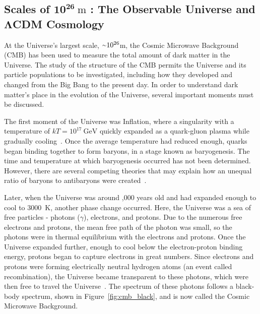 \subsection[Scales of $10^{26}\:\text{m}$ : The Observable Universe and $\Lambda$CDM Cosmology]{Scales of $\mathbf{10^{26}}\:\text{m}$ : The Observable Universe and $\mathbf{\Lambda}$CDM Cosmology}\label{dm_universe}
At the Universe's largest scale, $\nicetilde 10^{26}$m, the Cosmic Microwave Background (CMB) has been used to measure the total amount of dark matter in the Universe.
The study of the structure of the CMB permits the Universe and its particle populations to be investigated, including how they developed and changed from the Big Bang to the present day.
In order to understand dark matter's place in the evolution of the Universe, several important moments must be discussed.

The first moment of the Universe was Inflation, where a singularity with a temperature of $kT=10^{17}\:\textrm{GeV}$ quickly expanded as a quark-gluon plasma while gradually cooling~\cite{inflation0,inflation1,inflation2,inflation3}.
Once the average temperature had reduced enough, quarks began binding together to form baryons, in a stage known as baryogenesis.
The time and temperature at which baryogenesis occurred has not been determined.
However, there are several competing theories that may explain how an unequal ratio of baryons to antibaryons were created~\cite{baryogenesis1,baryogenesis2}.

Later, when the Universe was around ,000 years old and had expanded enough to cool to \nicetilde\SI{3000}{K}, another phase change occurred.
Here, the Universe was a sea of free particles - photons ($\gamma$), electrons, and protons.
Due to the numerous free electrons and protons, the mean free path of the photon was small, so the photons were in thermal equilibrium with the electrons and protons.
Once the Universe expanded further, enough to cool below the electron-proton binding energy, protons began to capture electrons in great numbers.
Since electrons and protons were forming electrically neutral hydrogen atoms (an event called recombination), the Universe became transparent to these photons, which were then free to travel the Universe~\cite{planck2015,theEarlyUniverse,CMBFundamentals,CMBFlat}.
The spectrum of these photons follows a black-body spectrum, shown in Figure~\ref{fig:cmb_black}, and is now called the Cosmic Microwave Background.

